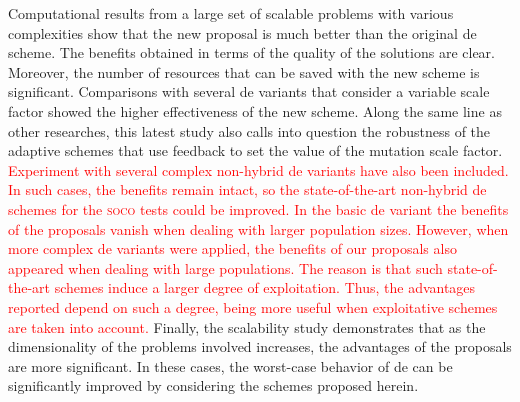 \documentclass[preprint,3p]{elsarticle}
\newcommand{\DE}{{\sc de}}
\begin{document}
Computational results from a large set of scalable problems with various
complexities show that the new proposal is much better
than the original \DE{} scheme.
%
The benefits obtained in terms of the quality of the solutions are clear.
%
Moreover, the number of resources that can be saved with the new scheme is significant.
%
Comparisons with several \DE{} variants that consider a variable scale factor showed
the higher effectiveness of the new scheme.
%
Along the same line as other researches, this latest study also calls
into question the robustness of the adaptive schemes
that use feedback to set the value of the mutation scale factor.
%
\textcolor{red}{
Experiment with several complex non-hybrid \DE{} variants have also been included.
%
In such cases, the benefits remain intact, so the state-of-the-art non-hybrid \DE{} schemes
for the \textsc{soco} tests could be improved. 
%
In the basic \DE{} variant the benefits of the proposals vanish when dealing with larger population sizes.
%
However, when more complex \DE{} variants were applied, the benefits of our proposals also appeared when 
dealing with large populations.
%
The reason is that such state-of-the-art schemes induce a larger degree of exploitation.
%
Thus, the advantages reported depend on such a degree, being more useful when exploitative schemes
are taken into account.
}
%
%
%
Finally, the scalability study demonstrates that as the dimensionality of the problems involved increases, the
advantages of the proposals are more significant.
%
In these cases, the worst-case behavior of \DE{} can be significantly improved by considering the
schemes proposed herein.
\end{document}
